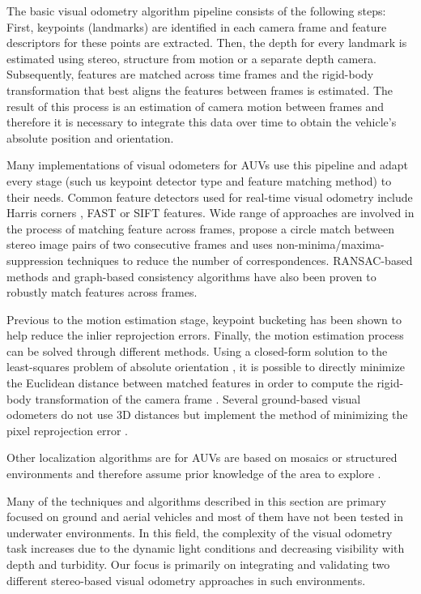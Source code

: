 \documentclass[conference]{IEEEtran}
\begin{document}
The basic visual odometry algorithm pipeline \cite{Moravec1980} consists of the following steps: First, keypoints (landmarks) are identified in each camera frame and feature descriptors for these points are extracted. Then, the depth for every landmark is estimated using stereo, structure from motion or a separate depth camera. Subsequently, features are matched across time frames and the rigid-body transformation that best aligns the features between frames is estimated. The result of this process is an estimation of camera motion between frames and therefore it is necessary to integrate this data over time to obtain the vehicle's absolute position and orientation.

Many implementations of visual odometers for AUVs use this pipeline and adapt every stage (such us keypoint detector type and feature matching method) to their needs. Common feature detectors used for real-time visual odometry include Harris corners \cite{Harris1988,Nister2006}, FAST \cite{Rosten2006,Huang2011} or SIFT \cite{Lowe2004,Botelho2009} features. Wide range of approaches are involved in the process of matching feature across frames, \cite{Geiger2011} propose a circle match between stereo image pairs of two consecutive frames and uses non-minima/maxima-suppression techniques \cite{Geiger2010} to reduce the number of correspondences. RANSAC-based methods \cite{Nister2004,Johnson2008} and graph-based consistency algorithms \cite{Howard2008} have also been proven to robustly match features across frames.

Previous to the motion estimation stage, keypoint bucketing \cite{Zhang1995} has been shown to help reduce the inlier reprojection errors. Finally, the motion estimation process can be solved through different methods. Using a closed-form solution to the least-squares problem of absolute orientation \cite{Horn1987}, it is possible to directly minimize the Euclidean distance between matched features in order to compute the rigid-body transformation of the camera frame \cite{Huang2011}. Several ground-based visual odometers do not use 3D distances but implement the method of minimizing the pixel reprojection error \cite{Howard2008,Geiger2011,Huan2011}. 

Other localization algorithms are for AUVs are based on mosaics or structured environments and therefore assume prior knowledge of the area to explore \cite{Garcia2001,Gracias2003,Carreras2003}.

Many of the techniques and algorithms described in this section are primary focused on ground and aerial vehicles and most of them have not been tested in underwater environments. In this field, the complexity of the visual odometry task increases due to the dynamic light conditions and decreasing visibility with depth and turbidity. Our focus is primarily on integrating and validating two different stereo-based visual odometry approaches in such environments.
\end{document}
